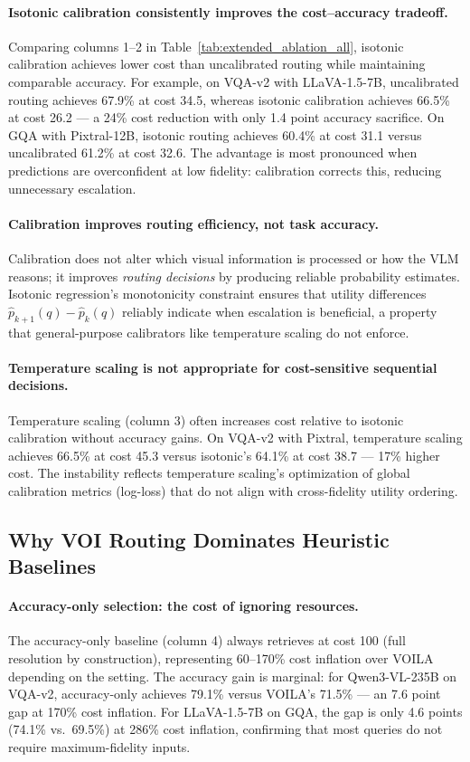 \paragraph{Isotonic calibration consistently improves the cost--accuracy tradeoff.}
Comparing columns 1--2 in Table~\ref{tab:extended_ablation_all}, isotonic calibration achieves lower cost than uncalibrated routing while maintaining comparable accuracy.
For example, on VQA-v2 with LLaVA-1.5-7B, uncalibrated routing achieves 67.9\% at cost 34.5, whereas isotonic calibration achieves 66.5\% at cost 26.2 --- a 24\% cost reduction with only 1.4 point accuracy sacrifice.
On GQA with Pixtral-12B, isotonic routing achieves 60.4\% at cost 31.1 versus uncalibrated 61.2\% at cost 32.6.
The advantage is most pronounced when predictions are overconfident at low fidelity: calibration corrects this, reducing unnecessary escalation.

\paragraph{Calibration improves routing efficiency, not task accuracy.}
Calibration does not alter which visual information is processed or how the VLM reasons; it improves \emph{routing decisions} by producing reliable probability estimates.
Isotonic regression's monotonicity constraint ensures that utility differences $\hat{p}_{k+1}(q) - \hat{p}_k(q)$ reliably indicate when escalation is beneficial, a property that general-purpose calibrators like temperature scaling do not enforce.

\paragraph{Temperature scaling is not appropriate for cost-sensitive sequential decisions.}
Temperature scaling (column 3) often increases cost relative to isotonic calibration without accuracy gains.
On VQA-v2 with Pixtral, temperature scaling achieves 66.5\% at cost 45.3 versus isotonic's 64.1\% at cost 38.7 --- 17\% higher cost.
The instability reflects temperature scaling's optimization of global calibration metrics (log-loss) that do not align with cross-fidelity utility ordering.

\subsection{Why VOI Routing Dominates Heuristic Baselines}
\label{sec:voi_dominance}

\paragraph{Accuracy-only selection: the cost of ignoring resources.}
The accuracy-only baseline (column 4) always retrieves at cost 100 (full resolution by construction), representing 60--170\% cost inflation over \textsc{VOILA} depending on the setting.
The accuracy gain is marginal: for Qwen3-VL-235B on VQA-v2, accuracy-only achieves 79.1\% versus \textsc{VOILA}'s 71.5\% --- an 7.6 point gap at 170\% cost inflation.
For LLaVA-1.5-7B on GQA, the gap is only 4.6 points (74.1\% vs.\ 69.5\%) at 286\% cost inflation, confirming that most queries do not require maximum-fidelity inputs.

